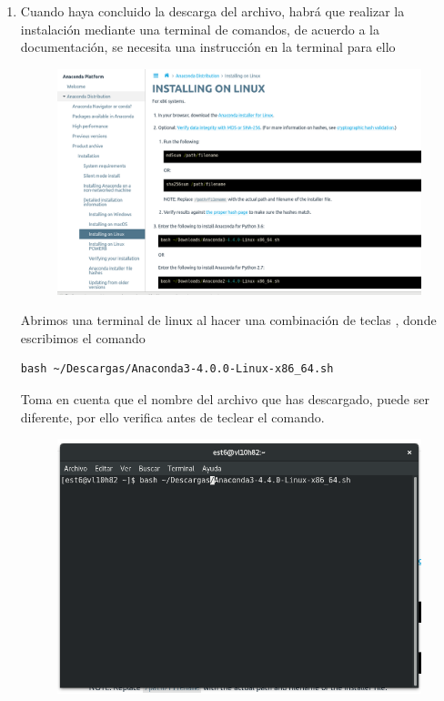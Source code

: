 \documentclass[12pt]{article}
\begin{document}
\begin{enumerate}
\begin{figure}[H]
\end{figure}
\item Cuando haya concluido la descarga del archivo, habrá que realizar la instalación mediante una terminal de comandos, de acuerdo a la documentación, se necesita una instrucción en la terminal para ello
\begin{figure}[H]
 	\centering
 	\includegraphics[scale=0.35]{Imagenes/Instalacion_Anaconda_01_linux_03}
\end{figure}
Abrimos una terminal de linux al hacer una combinación de teclas , donde escribimos el comando
\\
\begin{verbatim}
bash ~/Descargas/Anaconda3-4.0.0-Linux-x86_64.sh
\end{verbatim}
Toma en cuenta que el nombre del archivo que has descargado, puede ser diferente, por ello verifica antes de teclear el comando.
\begin{figure}[H]
 	\centering
 	\includegraphics[scale=0.35]{Imagenes/Instalacion_Anaconda_01_linux_04}

\end{figure}
\end{enumerate}
\end{document}
